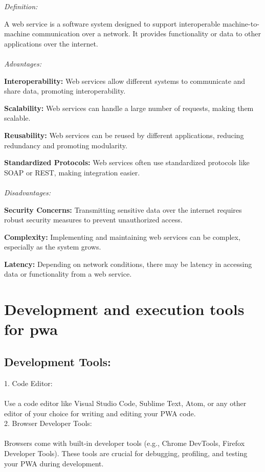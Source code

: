 \documentclass[journal]{IEEEtran}
\begin{document}
\textit{Definition:}

    A web service is a software system designed to support interoperable machine-to-machine communication over a network. It provides functionality or data to other applications over the internet.\\
\\\textit{Advantages:}

    \textbf{Interoperability:} Web services allow different systems to communicate and share data, promoting interoperability.
    
    \textbf{Scalability:} Web services can handle a large number of requests, making them scalable.
    
    \textbf{Reusability:} Web services can be reused by different applications, reducing redundancy and promoting modularity.
    
    \textbf{Standardized Protocols:} Web services often use standardized protocols like SOAP or REST, making integration easier.\\
\\\textit{Disadvantages:}

    \textbf{Security Concerns:} Transmitting sensitive data over the internet requires robust security measures to prevent unauthorized access.
    
    \textbf{Complexity:} Implementing and maintaining web services can be complex, especially as the system grows.
    
    \textbf{Latency:} Depending on network conditions, there may be latency in accessing data or functionality from a web service.
    
\section{Development and execution tools for pwa}

\subsection{Development Tools:}

1. Code Editor:\\
   \\Use a code editor like Visual Studio Code, Sublime Text, Atom, or any other editor of your choice for writing and editing your PWA code.\\

2. Browser Developer Tools:\\
   \\Browsers come with built-in developer tools (e.g., Chrome DevTools, Firefox Developer Tools). These tools are crucial for debugging, profiling, and testing your PWA during development.\\
\end{document}
